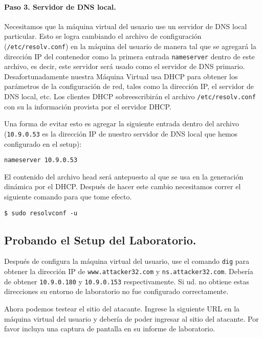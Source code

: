 \paragraph{Paso 3. Servidor de DNS local.}
Necesitamos que la máquina virtual del usuario use un servidor de DNS local particular.
Esto se logra cambiando el archivo de configuración (\texttt{/etc/resolv.conf}) en la máquina del usuario de manera tal que se agregará la dirección IP del contenedor como la primera entrada \texttt{nameserver} dentro de este archivo, es decir, este servidor será usado como el servidor de DNS primario.
Desafortunadamente nuestra Máquina Virtual usa DHCP para obtener los parámetros de la configuración de red, tales como la dirección IP, el servidor de DNS local, etc. Los clientes DHCP sobreescribirán el archivo \texttt{/etc/resolv.conf} con su la información provista por el servidor DHCP.

Una forma de evitar esto es agregar la siguiente entrada dentro del archivo   (\texttt{10.9.0.53} es la dirección IP de nuestro servidor de DNS local que hemos configurado en el setup):

\begin{lstlisting}
nameserver 10.9.0.53
\end{lstlisting}

El contenido del archivo head será antepuesto al que se usa en la generación dinámica por el DHCP. Después de hacer este cambio necesitamos correr el siguiente comando para que tome efecto.

\begin{lstlisting}
$ sudo resolvconf -u
\end{lstlisting}




\subsection{Probando el Setup del Laboratorio.}

Después de configura la máquina virtual del usuario, use el comando \texttt{dig} para obtener la dirección IP de \texttt{www.attacker32.com} y \texttt{ns.attacker32.com}. Debería de obtener \texttt{10.9.0.180} y \texttt{10.9.0.153} respectivamente. Si ud. no obtiene estas direcciones su entorno de laboratorio no fue configurado correctamente.

Ahora podemos testear el sitio del atacante.
Ingrese la siguiente URL en la máquina virtual del usuario y debería de poder ingresar al sitio del atacante.
Por favor incluya una captura de pantalla en su informe de laboratorio.


